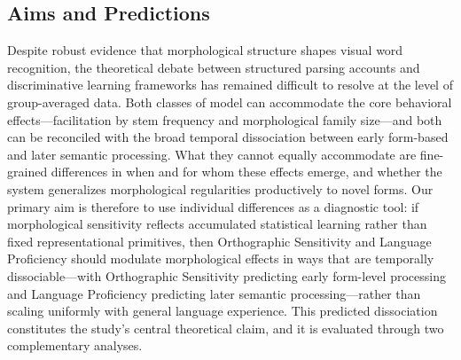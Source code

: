 \documentclass[utf8]{FrontiersinHarvard} %
\begin{document}
\subsection{Aims and Predictions}

Despite robust evidence that morphological structure shapes visual word recognition, the theoretical debate between structured parsing accounts and discriminative learning frameworks has remained difficult to resolve at the level of group-averaged data. Both classes of model can accommodate the core behavioral effects—facilitation by stem frequency and morphological family size—and both can be reconciled with the broad temporal dissociation between early form-based and later semantic processing. What they cannot equally accommodate are fine-grained differences in when and for whom these effects emerge, and whether the system generalizes morphological regularities productively to novel forms. Our primary aim is therefore to use individual differences as a diagnostic tool: if morphological sensitivity reflects accumulated statistical learning rather than fixed representational primitives, then Orthographic Sensitivity and Language Proficiency should modulate morphological effects in ways that are temporally dissociable—with Orthographic Sensitivity predicting early form-level processing and Language Proficiency predicting later semantic processing—rather than scaling uniformly with general language experience. This predicted dissociation constitutes the study's central theoretical claim, and it is evaluated through two complementary analyses.
\end{document}
